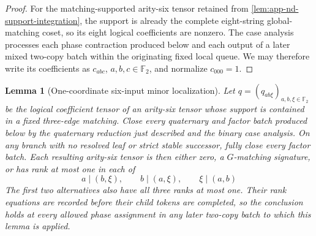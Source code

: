 \documentclass[11pt,letterpaper,onecolumn]{article}
\theoremstyle{plain}
\newtheorem{lemma}[lemma]{Lemma}
\theoremstyle{definition}
\theoremstyle{remark}
\newcommand{\Ftwo}{\mathbb F_2}
\begin{document}
\begin{proof}
For the matching-supported arity-six tensor retained from
\cref{lem:app-nd-support-integration}, the support is already the complete
eight-string global-matching coset, so its eight logical coefficients are
nonzero. The case analysis processes each phase contraction produced below
and each output of a later mixed two-copy batch within the originating
fixed local queue.  We may therefore write its coefficients as \(c_{abc}\),
\(a,b,c\in\Ftwo\), and normalize \(c_{000}=1\).
\end{proof}

\begin{lemma}[One-coordinate six-input minor localization]
\label{lem:nd-q6-minor-localization}
Let \(q=(q_{ab\xi})_{a,b,\xi\in\Ftwo}\) be the logical coefficient tensor of
an arity-six tensor whose support is contained in a fixed three-edge matching.
Close every quaternary and factor batch produced below by the
quaternary reduction just described and the binary case analysis.  On any branch
with no resolved leaf or strict stable successor, fully close every factor
batch.  Each resulting arity-six tensor is then either zero, a \(G\)-matching signature, or has rank at most one in each of
\[
 a\mid(b,\xi),\qquad b\mid(a,\xi),\qquad \xi\mid(a,b)
\]
The first two alternatives also have all three ranks at most one.  Their
rank equations are recorded before their child tokens are completed, so
the conclusion holds at every allowed phase assignment in any later
two-copy batch to which this lemma is applied.
\end{lemma}
\end{document}
